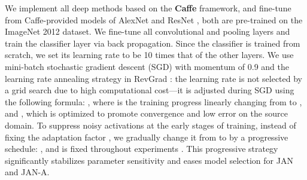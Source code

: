 \documentclass{article}
\begin{document}
We implement all deep methods based on the \textbf{Caffe} framework, and fine-tune from Caffe-provided models of AlexNet \cite{cite:NIPS12CNN} and ResNet \cite{cite:CVPR16DRL}, both are pre-trained on the ImageNet 2012 dataset. We fine-tune all convolutional and pooling layers and train the classifier layer via back propagation. Since the classifier is trained from scratch, we set its learning rate to be 10 times that of the other layers. We use mini-batch stochastic gradient descent (SGD) with momentum of 0.9 and the learning rate annealing strategy in RevGrad \cite{cite:ICML15RevGrad}: the learning rate is not selected by a grid search due to high computational cost---it is adjusted during SGD using the following formula: , where  is the training progress linearly changing from  to ,  and , which is optimized to promote convergence and low error on the source domain. To suppress noisy activations at the early stages of training, instead of fixing the adaptation factor , we gradually change it from  to  by a progressive schedule: , and  is fixed throughout experiments \cite{cite:ICML15RevGrad}. This progressive strategy significantly stabilizes parameter sensitivity and eases model selection for JAN and JAN-A.
\end{document}
